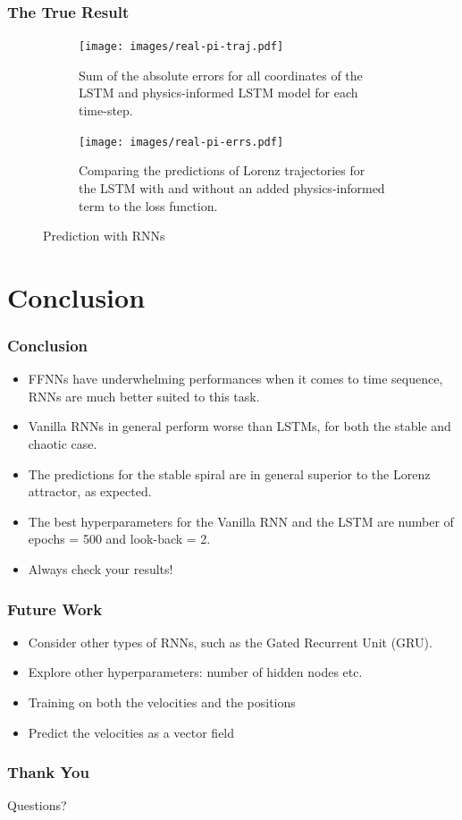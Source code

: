 \documentclass{beamer}
\begin{document}
\begin{frame}[t]
	\frametitle{The True Result}
	\begin{figure}[ht]
		\centering
		\begin{subfigure}[b]{0.5\textwidth}
		\begin{center}
			\texttt{[image: images/real-pi-traj.pdf]}
		\end{center}
		\caption{Sum of the absolute errors for all coordinates of the LSTM and physics-informed LSTM model for each time-step.}
		\end{subfigure}
		\begin{subfigure}[b]{0.45\textwidth}
		      \centering
		      \texttt{[image: images/real-pi-errs.pdf]}

		      \caption{Comparing the predictions of Lorenz trajectories for the LSTM with and without an added physics-informed term to the loss function.}
		      \label{fig:rnn-pi}
	    \end{subfigure}

		\caption{Prediction with RNNs}
		\label{fig:real-pi}
	\end{figure}
	
\end{frame}

\section{Conclusion}

\begin{frame}[t]
	\frametitle{Conclusion}
	\begin{itemize}
		\item FFNNs have underwhelming performances when it comes to time sequence, RNNs are much better suited to this task.
		\item Vanilla RNNs in general perform worse than LSTMs, for both the stable and chaotic case.
		\item The predictions for the stable spiral are in general superior to the Lorenz attractor, as expected.
		\item The best hyperparameters for the Vanilla RNN and the LSTM are number of epochs = 500 and look-back = 2.
		\item<2-> Always check your results!
	\end{itemize}
	
\end{frame}
\begin{frame}[t]
\frametitle{Future Work}
\begin{itemize}
\item Consider other types of RNNs, such as the Gated Recurrent Unit (GRU).
\item Explore other hyperparameters: number of hidden nodes etc.
\item Training on both the velocities and the positions
\item Predict the velocities as a vector field
\end{itemize}
\end{frame}


\begin{frame}[t]
\frametitle{Thank You}
\centering
Questions?
\end{frame}
\end{document}
